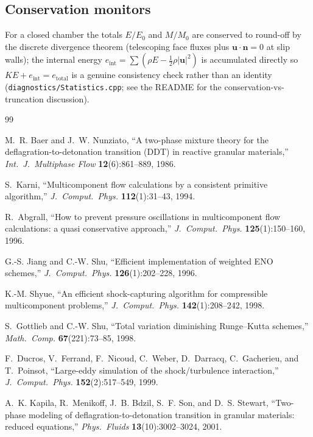 \documentclass[11pt]{article}
\newcommand{\uvec}{\mathbf{u}}
\newcommand{\code}[1]{\texttt{#1}}
\begin{document}
\subsection{Conservation monitors}
For a closed chamber the totals $E/E_0$ and $M/M_0$ are conserved to round-off by
the discrete divergence theorem (telescoping face fluxes plus $\uvec\cdot\mathbf{n}=0$
at slip walls); the internal energy $e_{\text{int}} = \sum(\rho E - \tfrac12\rho|\uvec|^2)$
is accumulated directly so $KE + e_{\text{int}} = e_{\text{total}}$ is a genuine
consistency check rather than an identity (\code{diagnostics/Statistics.cpp};
see the README for the conservation-vs-truncation discussion).

\begin{thebibliography}{99}

M.~R. Baer and J.~W. Nunziato,
``A two-phase mixture theory for the deflagration-to-detonation transition (DDT)
in reactive granular materials,''
\textit{Int.\ J.\ Multiphase Flow} \textbf{12}(6):861--889, 1986.

S.~Karni,
``Multicomponent flow calculations by a consistent primitive algorithm,''
\textit{J.\ Comput.\ Phys.} \textbf{112}(1):31--43, 1994.

R.~Abgrall,
``How to prevent pressure oscillations in multicomponent flow calculations:
a quasi conservative approach,''
\textit{J.\ Comput.\ Phys.} \textbf{125}(1):150--160, 1996.

G.-S. Jiang and C.-W. Shu,
``Efficient implementation of weighted ENO schemes,''
\textit{J.\ Comput.\ Phys.} \textbf{126}(1):202--228, 1996.

K.-M. Shyue,
``An efficient shock-capturing algorithm for compressible multicomponent
problems,''
\textit{J.\ Comput.\ Phys.} \textbf{142}(1):208--242, 1998.

S.~Gottlieb and C.-W. Shu,
``Total variation diminishing Runge--Kutta schemes,''
\textit{Math.\ Comp.} \textbf{67}(221):73--85, 1998.

F.~Ducros, V.~Ferrand, F.~Nicoud, C.~Weber, D.~Darracq, C.~Gacherieu, and
T.~Poinsot,
``Large-eddy simulation of the shock/turbulence interaction,''
\textit{J.\ Comput.\ Phys.} \textbf{152}(2):517--549, 1999.

A.~K. Kapila, R.~Menikoff, J.~B. Bdzil, S.~F. Son, and D.~S. Stewart,
``Two-phase modeling of deflagration-to-detonation transition in granular
materials: reduced equations,''
\textit{Phys.\ Fluids} \textbf{13}(10):3002--3024, 2001.


\end{thebibliography}
\end{document}

